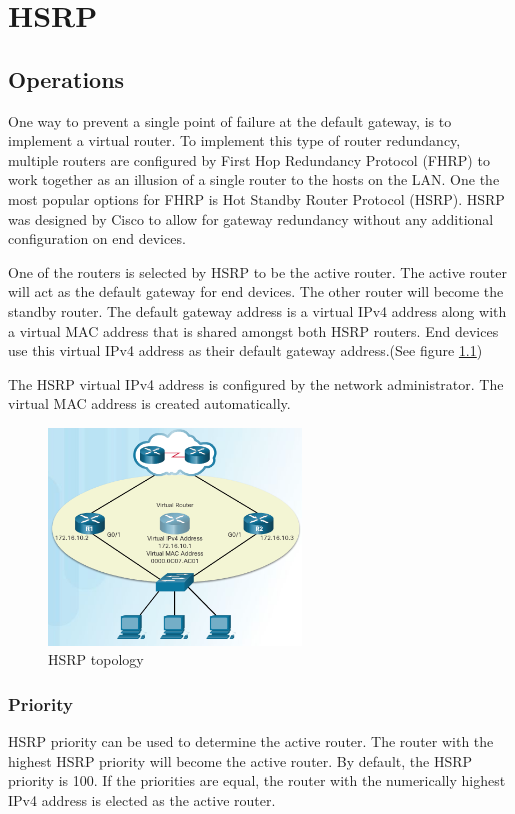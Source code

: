 \chapter{HSRP}
\section{Operations}
One way to prevent a single point of failure at the default gateway, is to implement a virtual router. To implement this type of router redundancy, multiple routers are configured by First Hop Redundancy Protocol (FHRP) to work together as an illusion of a single router to the hosts on the LAN. One the most popular options for FHRP is Hot Standby Router Protocol (HSRP). HSRP was designed by Cisco to allow for gateway redundancy without any additional configuration on end devices.\par 
One of the routers is selected by HSRP to be the active router. The active router will act as the default gateway for end devices. The other router will become the standby router. The default gateway address is a virtual IPv4 address along with a virtual MAC address that is shared amongst both HSRP routers. End devices use this virtual IPv4 address as their default gateway address.(See figure \ref{HSRP-topology}) \par 
The HSRP virtual IPv4 address is configured by the network administrator. The virtual MAC address is created automatically.
\begin{figure}[hbtp]
\centering
\includegraphics[width=0.6\textwidth]{pictures/HSRP.png}
\caption{HSRP topology}
\label{HSRP-topology}
\end{figure}
\subsection{Priority}
HSRP priority can be used to determine the active router. The router with the highest HSRP priority will become the active router. By default, the HSRP priority is 100. If the priorities are equal, the router with the numerically highest IPv4 address is elected as the active router.
